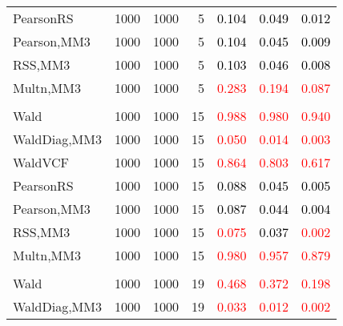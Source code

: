 \documentclass[
]{article}
\begin{document}
\begin{table}[H]
{\begin{tabular}[t]{lrrrrrr}
\hspace{1em}PearsonRS & 1000 & 1000 & 5 & \textcolor{black}{0.104} & \textcolor{black}{0.049} & \textcolor{black}{0.012}\\
\hspace{1em}Pearson,MM3 & 1000 & 1000 & 5 & \textcolor{black}{0.104} & \textcolor{black}{0.045} & \textcolor{black}{0.009}\\
\hspace{1em}RSS,MM3 & 1000 & 1000 & 5 & \textcolor{black}{0.103} & \textcolor{black}{0.046} & \textcolor{black}{0.008}\\
\hspace{1em}Multn,MM3 & 1000 & 1000 & 5 & \textcolor{red}{0.283} & \textcolor{red}{0.194} & \textcolor{red}{0.087}\\
\addlinespace[0.3em]
\multicolumn{7}{l}{\textbf{1F 15V}}\\
\hspace{1em}Wald & 1000 & 1000 & 15 & \textcolor{red}{0.988} & \textcolor{red}{0.980} & \textcolor{red}{0.940}\\
\hspace{1em}WaldDiag,MM3 & 1000 & 1000 & 15 & \textcolor{red}{0.050} & \textcolor{red}{0.014} & \textcolor{red}{0.003}\\
\hspace{1em}WaldVCF & 1000 & 1000 & 15 & \textcolor{red}{0.864} & \textcolor{red}{0.803} & \textcolor{red}{0.617}\\
\hspace{1em}PearsonRS & 1000 & 1000 & 15 & \textcolor{black}{0.088} & \textcolor{black}{0.045} & \textcolor{black}{0.005}\\
\hspace{1em}Pearson,MM3 & 1000 & 1000 & 15 & \textcolor{black}{0.087} & \textcolor{black}{0.044} & \textcolor{black}{0.004}\\
\hspace{1em}RSS,MM3 & 1000 & 1000 & 15 & \textcolor{red}{0.075} & \textcolor{black}{0.037} & \textcolor{red}{0.002}\\
\hspace{1em}Multn,MM3 & 1000 & 1000 & 15 & \textcolor{red}{0.980} & \textcolor{red}{0.957} & \textcolor{red}{0.879}\\
\addlinespace[0.3em]
\multicolumn{7}{l}{\textbf{2F 10V}}\\
\hspace{1em}Wald & 1000 & 1000 & 19 & \textcolor{red}{0.468} & \textcolor{red}{0.372} & \textcolor{red}{0.198}\\
\hspace{1em}WaldDiag,MM3 & 1000 & 1000 & 19 & \textcolor{red}{0.033} & \textcolor{red}{0.012} & \textcolor{red}{0.002}\\

\end{tabular}}
\end{table}
\end{document}
